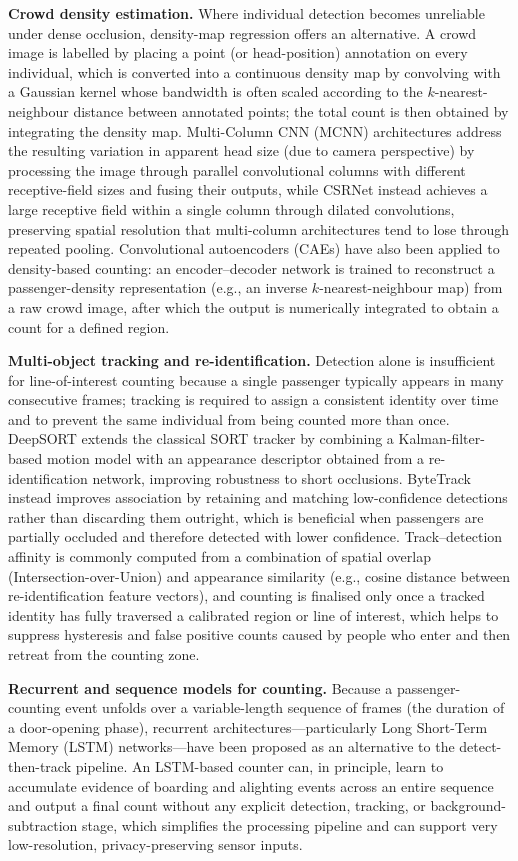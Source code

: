 \documentclass[12pt,a4paper]{report}
\begin{document}
\textbf{Crowd density estimation.} Where individual detection becomes unreliable under dense occlusion, density-map regression offers an alternative. A crowd image is labelled by placing a point (or head-position) annotation on every individual, which is converted into a continuous density map by convolving with a Gaussian kernel whose bandwidth is often scaled according to the $k$-nearest-neighbour distance between annotated points; the total count is then obtained by integrating the density map. Multi-Column CNN (MCNN) architectures address the resulting variation in apparent head size (due to camera perspective) by processing the image through parallel convolutional columns with different receptive-field sizes and fusing their outputs, while CSRNet instead achieves a large receptive field within a single column through dilated convolutions, preserving spatial resolution that multi-column architectures tend to lose through repeated pooling. Convolutional autoencoders (CAEs) have also been applied to density-based counting: an encoder--decoder network is trained to reconstruct a passenger-density representation (e.g., an inverse $k$-nearest-neighbour map) from a raw crowd image, after which the output is numerically integrated to obtain a count for a defined region.

\textbf{Multi-object tracking and re-identification.} Detection alone is insufficient for line-of-interest counting because a single passenger typically appears in many consecutive frames; tracking is required to assign a consistent identity over time and to prevent the same individual from being counted more than once. DeepSORT extends the classical SORT tracker by combining a Kalman-filter-based motion model with an appearance descriptor obtained from a re-identification network, improving robustness to short occlusions. ByteTrack instead improves association by retaining and matching low-confidence detections rather than discarding them outright, which is beneficial when passengers are partially occluded and therefore detected with lower confidence. Track--detection affinity is commonly computed from a combination of spatial overlap (Intersection-over-Union) and appearance similarity (e.g., cosine distance between re-identification feature vectors), and counting is finalised only once a tracked identity has fully traversed a calibrated region or line of interest, which helps to suppress hysteresis and false positive counts caused by people who enter and then retreat from the counting zone.

\textbf{Recurrent and sequence models for counting.} Because a passenger-counting event unfolds over a variable-length sequence of frames (the duration of a door-opening phase), recurrent architectures---particularly Long Short-Term Memory (LSTM) networks---have been proposed as an alternative to the detect-then-track pipeline. An LSTM-based counter can, in principle, learn to accumulate evidence of boarding and alighting events across an entire sequence and output a final count without any explicit detection, tracking, or background-subtraction stage, which simplifies the processing pipeline and can support very low-resolution, privacy-preserving sensor inputs.
\end{document}
